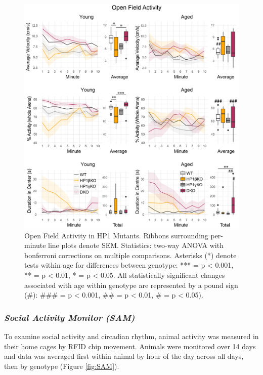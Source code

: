 \documentclass[onehalf,12pt]{beavtex}
\begin{document}
  \begin{figure}
  
  {\centering \includegraphics[width=1\linewidth, ]{./figure/results/Open_field} 
  
  }
  
  \caption[Open Field Activity in HP1 Mutants]{Open Field Activity in HP1 Mutants. Ribbons surrounding per-minute line plots denote SEM. Statistics: two-way ANOVA with bonferroni corrections on multiple comparisons. Asterisks (*) denote tests within age for differences between genotype: *** = p < 0.001, ** = p < 0.01, * = p < 0.05. All statistically significant changes associated with age within genotype are represented by a pound sign (\#): \#\#\# = p < 0.001,  \#\# = p < 0.01, \# = p < 0.05).}\label{fig:openfield}
  \end{figure}
  
  \subsubsection*{\texorpdfstring{\emph{Social Activity Monitor
  (SAM)}}{Social Activity Monitor (SAM)}}\label{social-activity-monitor-sam}
  
  To examine social activity and circadian rhythm, animal activity was
  measured in their home cages by RFID chip movement. Animals were
  monitored over 14 days and data was averaged first within animal by hour
  of the day across all days, then by genotype (Figure \ref{fig:SAM}).
  
\end{document}
